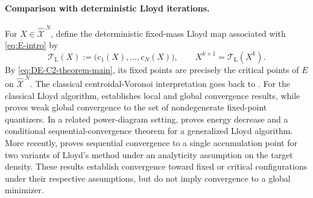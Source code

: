 \documentclass[11pt]{article}
\def\Xc{{\mathcal X}}
\def\hX{\widehat{\Xc}^{\,N}}
\theoremstyle{definition}
\theoremstyle{remark}
\numberwithin{equation}{section}
\begin{document}
\paragraph{Comparison with deterministic Lloyd iterations.}
For $X\in\hX$, define the deterministic fixed-mass Lloyd map associated with
\eqref{eq:E-intro} by
\[
 \mathcal T_{\mathrm L}(X)
 :=\bigl(c_1(X),\ldots,c_N(X)\bigr),
 \qquad
 X^{k+1}=\mathcal T_{\mathrm L}(X^k).
\]
By \eqref{eq:DE-C2-theorem-main}, its fixed points are precisely the critical points of $E$ on
$\hX$.  The classical centroidal-Voronoi interpretation goes back to
\cite{DuFaberGunzburger1999}.  For the classical Lloyd algorithm,
\cite{DuEmelianenkoJu2006} establishes local and global convergence results, while
\cite{EmelianenkoJuRand2008} proves weak global convergence to the set of nondegenerate
fixed-point quantizers.  In a related power-diagram setting, \cite{BourneRoper2015} proves energy
decrease and a conditional sequential-convergence theorem for a generalized Lloyd algorithm.
More recently, \cite{PortalesCazellesPauwels2025} proves sequential convergence to a single
accumulation point for two variants of Lloyd's method under an analyticity assumption on the target
density.  These results establish convergence toward fixed or critical configurations under their
respective assumptions, but do not imply convergence to a global minimizer.
\end{document}
